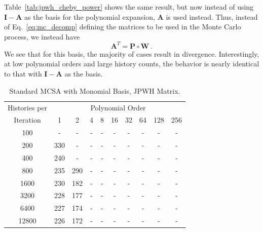 \documentclass[10pt]{article}
\newcommand{\bA}{\ensuremath{\mathbf{A}}}
\newcommand{\bP}{\ensuremath{\mathbf{P}}}
\newcommand{\bW}{\ensuremath{\mathbf{W}}}
\newcommand{\bI}{\ensuremath{\mathbf{I}}}
\begin{document}
Table~\ref{tab:jpwh_cheby_power} shows the same result,
but now instead of using $\bI - \bA$ as the basis for the
polynomial expansion, $\bA$ is used instead.
Thus, instead of Eq.~\eqref{eq:mc_decomp} defining the
matrices to be used in the Monte Carlo process, we instead
have
\begin{equation}
\bA^T = \bP \circ \bW \:.
\end{equation}
We see that
for this basis, the majority of cases result in divergence.
Interestingly, at low polynomial orders and large history
counts, the behavior is nearly identical to that with
$\bI - \bA$ as the basis.
\begin{table}
\caption{Standard MCSA with Monomial Basis, JPWH Matrix.
\label{tab:jpwh_standard_power}}
\centering
\begin{tabular}{cccccccccc}
\toprule
Histories per & \multicolumn{9}{c}{Polynomial Order} \\
Iteration & 1 & 2 & 4 & 8 & 16 & 32 & 64 & 128 & 256 \\
\midrule
    100 & -     & -     & - & - & - & - & - & - & - \\
    200 & 330 & -     & - & - & - & - & - & - & - \\
    400 & 240 & -     & - & - & - & - & - & - & - \\
    800 & 235 & 290 & - & - & - & - & - & - & - \\
  1600 & 230 & 182 & - & - & - & - & - & - & - \\
  3200 & 228 & 177 & - & - & - & - & - & - & - \\
  6400 & 227 & 174 & - & - & - & - & - & - & - \\
12800 & 226 & 172 & - & - & - & - & - & - & - \\
\bottomrule
\end{tabular}
\end{table}
\end{document}
